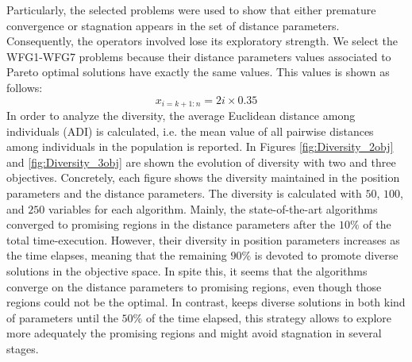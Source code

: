 %
Particularly, the selected problems were used to show that either premature convergence or stagnation appears in the set of distance parameters.
%
Consequently, the operators involved lose its exploratory strength.
%
We select the WFG1-WFG7 problems because their distance parameters values associated to Pareto optimal solutions have exactly the same values.
%
This values is shown as follows:
\begin{equation}
   x_{i=k+1:n} = 2i \times 0.35
\end{equation}
%
%
In order to analyze the diversity, the average Euclidean distance among individuals (ADI) is calculated, i.e. the mean value of all pairwise distances among individuals in the population is reported.
%
In Figures \ref{fig:Diversity_2obj} and \ref{fig:Diversity_3obj} are shown the evolution of diversity with two and three objectives.
%
Concretely, each figure shows the diversity maintained in the position parameters and the distance parameters.
%
The diversity is calculated with $50$, $100$, and $250$ variables for each algorithm.
%
Mainly, the state-of-the-art algorithms converged to promising regions in the distance parameters after the $10\%$ of the total time-execution.
%
However, their diversity in position parameters increases as the time elapses, meaning that the remaining $90\%$ is devoted to promote diverse solutions in the objective space.
%
In spite this, it seems that the algorithms converge on the distance parameters to promising regions, even though those regions could not be the optimal.
%
In contrast, \VSDMOEA{} keeps diverse solutions in both kind of parameters until the $50\%$ of the time elapsed, this strategy allows to explore more adequately the promising regions and might avoid stagnation in several stages.
%
